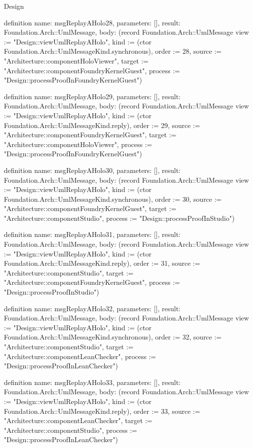\begin{lexlean}{Design}
\begin{semanticmodule}
definition{
  name: msgReplayAHolo28,
  parameters: [],
  result: Foundation.Arch::UmlMessage,
  body: (record Foundation.Arch::UmlMessage {view := "Design::viewUmlReplayAHolo", kind := (ctor Foundation.Arch::UmlMessageKind.synchronous), order := 28, source := "Architecture::componentHoloViewer", target := "Architecture::componentFoundryKernelGuest", process := "Design::processProofInFoundryKernelGuest"})
}

definition{
  name: msgReplayAHolo29,
  parameters: [],
  result: Foundation.Arch::UmlMessage,
  body: (record Foundation.Arch::UmlMessage {view := "Design::viewUmlReplayAHolo", kind := (ctor Foundation.Arch::UmlMessageKind.reply), order := 29, source := "Architecture::componentFoundryKernelGuest", target := "Architecture::componentHoloViewer", process := "Design::processProofInFoundryKernelGuest"})
}

definition{
  name: msgReplayAHolo30,
  parameters: [],
  result: Foundation.Arch::UmlMessage,
  body: (record Foundation.Arch::UmlMessage {view := "Design::viewUmlReplayAHolo", kind := (ctor Foundation.Arch::UmlMessageKind.synchronous), order := 30, source := "Architecture::componentFoundryKernelGuest", target := "Architecture::componentStudio", process := "Design::processProofInStudio"})
}

definition{
  name: msgReplayAHolo31,
  parameters: [],
  result: Foundation.Arch::UmlMessage,
  body: (record Foundation.Arch::UmlMessage {view := "Design::viewUmlReplayAHolo", kind := (ctor Foundation.Arch::UmlMessageKind.reply), order := 31, source := "Architecture::componentStudio", target := "Architecture::componentFoundryKernelGuest", process := "Design::processProofInStudio"})
}

definition{
  name: msgReplayAHolo32,
  parameters: [],
  result: Foundation.Arch::UmlMessage,
  body: (record Foundation.Arch::UmlMessage {view := "Design::viewUmlReplayAHolo", kind := (ctor Foundation.Arch::UmlMessageKind.synchronous), order := 32, source := "Architecture::componentStudio", target := "Architecture::componentLeanChecker", process := "Design::processProofInLeanChecker"})
}

definition{
  name: msgReplayAHolo33,
  parameters: [],
  result: Foundation.Arch::UmlMessage,
  body: (record Foundation.Arch::UmlMessage {view := "Design::viewUmlReplayAHolo", kind := (ctor Foundation.Arch::UmlMessageKind.reply), order := 33, source := "Architecture::componentLeanChecker", target := "Architecture::componentStudio", process := "Design::processProofInLeanChecker"})
}


\end{semanticmodule}
\end{lexlean}
